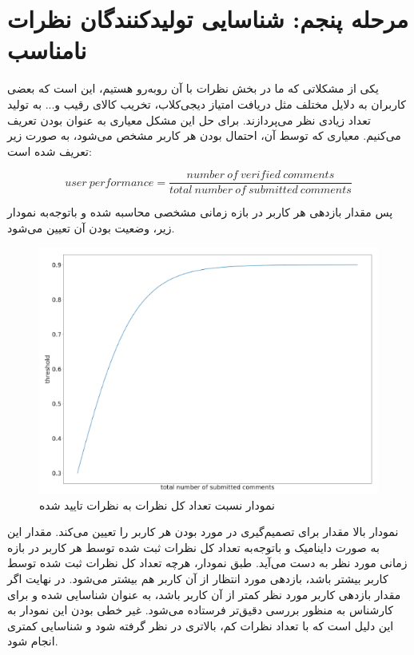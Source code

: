 \section{مرحله پنجم: شناسایی تولیدکنندگان نظرات نامناسب}
یکی از مشکلاتی که ما در بخش نظرات با آن روبه‌رو هستیم، این است که بعضی کاربران به دلایل مختلف مثل دریافت امتیاز دیجی‌کلاب، تخریب کالای رقیب و... به تولید تعداد زیادی نظر می‌پردازند. برای حل این مشکل معیاری به عنوان  بودن تعریف می‌کنیم.
معیاری که توسط آن، احتمال  بودن هر کاربر مشخص می‌شود، به صورت زیر تعریف شده است:

\begin{equation}
user \: performance = \dfrac{number \: of \: verified \: comments}{total \: number \: of \: submitted \: comments}
\end{equation}

پس مقدار بازدهی هر کاربر در بازه زمانی مشخصی محاسبه شده و باتوجه‌به نمودار زیر، وضعیت   بودن آن تعیین می‌شود.


\begin{figure}[H]
\centering
\includegraphics[width=15cm]{figs/spammer.png}
\caption{نمودار نسبت تعداد کل نظرات به نظرات تایید شده}\label{}
\label{fig:test}
\end{figure}

نمودار بالا مقدار  برای تصمیم‌گیری در مورد  بودن هر کاربر را تعیین می‌کند. مقدار این  به صورت داینامیک و باتوجه‌به تعداد کل نظرات ثبت شده توسط هر کاربر در بازه زمانی مورد نظر به دست می‌آید. 
طبق نمودار، هرچه تعداد کل نظرات ثبت شده توسط کاربر بیشتر باشد، بازدهی مورد انتظار از آن کاربر هم بیشتر می‌شود. در نهایت اگر مقدار بازدهی کاربر مورد نظر کمتر از  آن کاربر باشد، به عنوان  شناسایی شده و برای کارشناس به منظور بررسی دقیق‌تر فرستاده می‌شود. 
غیر خطی بودن این نمودار به این دلیل است که با تعداد نظرات کم،  بالاتری در نظر گرفته‌ شود و شناسایی کمتری انجام شود.


